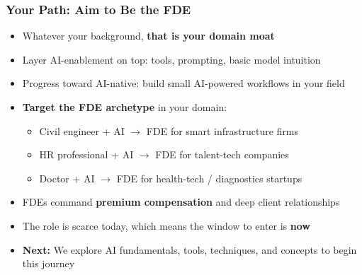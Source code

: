  
\begin{frame}[fragile]\frametitle{Your Path: Aim to Be the FDE}
\begin{itemize}
  \item Whatever your background, \textbf{that is your domain moat}
  \item Layer AI-enablement on top: tools, prompting, basic model intuition
  \item Progress toward AI-native: build small AI-powered workflows in your field
  \item \textbf{Target the FDE archetype} in your domain:
    \begin{itemize}
      \item Civil engineer + AI $\rightarrow$ FDE for smart infrastructure firms
      \item HR professional + AI $\rightarrow$ FDE for talent-tech companies
      \item Doctor + AI $\rightarrow$ FDE for health-tech / diagnostics startups
    \end{itemize}
  \item FDEs command \textbf{premium compensation} and deep client relationships
  \item The role is scarce today, which means the window to enter is \textbf{now}
  \item \textbf{Next:} We explore AI fundamentals, tools, techniques, and concepts to begin this journey
\end{itemize}
\end{frame}
